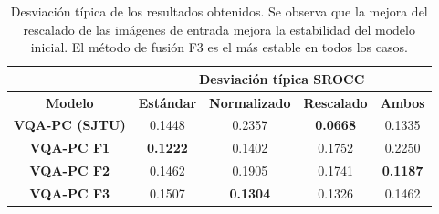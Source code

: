 \begin{table}[htp]
  \scriptsize
  \centering
\begin{tabular}{|c|cccc|}
\hline
\rowcolor[HTML]{FFC702}
                       & \multicolumn{4}{c|}{\textbf{Desviación típica SROCC}}                                                                                                \\ \hline
\rowcolor[HTML]{FFC702}
\textbf{Modelo}        & \multicolumn{1}{c|}{\textbf{Estándar}} & \multicolumn{1}{c|}{\textbf{Normalizado}} & \multicolumn{1}{c|}{\textbf{Rescalado}} & \textbf{Ambos}  \\ \hline
\textbf{VQA-PC (SJTU)} & \multicolumn{1}{c|}{0.1448}            & \multicolumn{1}{c|}{0.2357}               & \multicolumn{1}{c|}{\textbf{0.0668}}    & 0.1335          \\ \hline
\textbf{VQA-PC F1}     & \multicolumn{1}{c|}{\textbf{0.1222}}   & \multicolumn{1}{c|}{0.1402}               & \multicolumn{1}{c|}{0.1752}             & 0.2250          \\ \hline
\textbf{VQA-PC F2}     & \multicolumn{1}{c|}{0.1462}            & \multicolumn{1}{c|}{0.1905}               & \multicolumn{1}{c|}{0.1741}             & \textbf{0.1187} \\ \hline
\textbf{VQA-PC F3}     & \multicolumn{1}{c|}{0.1507}            & \multicolumn{1}{c|}{\textbf{0.1304}}      & \multicolumn{1}{c|}{0.1326}             & 0.1462          \\ \hline
\end{tabular}
\caption[Desviación típica de los resultados médicos]{Desviación típica de los 
resultados obtenidos. Se observa que la mejora del rescalado de las imágenes 
de entrada mejora la estabilidad del modelo inicial. El método de fusión F3 
es el más estable en todos los casos. }
\label{tab:STDevMed}
\end{table}

